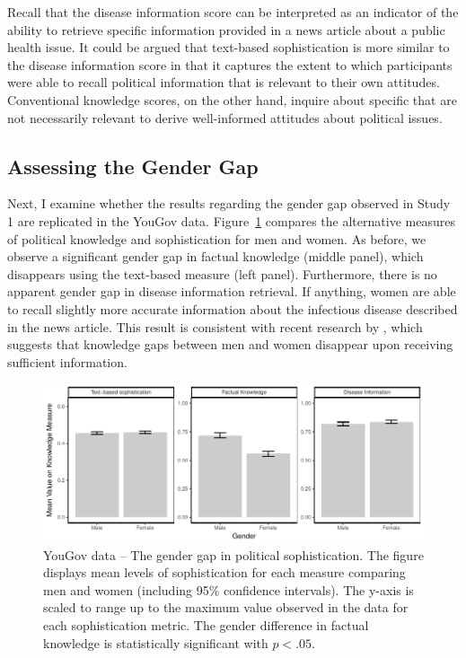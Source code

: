 \documentclass[12pt]{article}
\begin{document}
Recall that the disease information score can be interpreted as an indicator of the ability to retrieve specific information provided in a news article about a public health issue. It could be argued that text-based sophistication is more similar to the disease information score in that it captures the extent to which participants were able to recall political information that is relevant to their own attitudes. Conventional knowledge scores, on the other hand, inquire about specific that are not necessarily relevant to derive well-informed attitudes about political issues.


\subsection*{Assessing the Gender Gap}

Next, I examine whether the results regarding the gender gap observed in Study 1 are replicated in the YouGov data. Figure~\ref{fig:yg_meandiff} compares the alternative measures of political knowledge and sophistication for men and women. As before, we observe a significant gender gap in factual knowledge (middle panel), which disappears using the text-based measure (left panel). Furthermore, there is no apparent gender gap in disease information retrieval. If anything, women are able to recall slightly more accurate information about the infectious disease described in the news article. This result is consistent with recent research by \citet{jerit2017revisiting}, which suggests that knowledge gaps between men and women disappear upon receiving sufficient information.

\begin{figure}[h]\centering
\includegraphics{../fig/yg_meandiff.pdf}
\caption{YouGov data -- The gender gap in political sophistication. The figure displays mean levels of sophistication for each measure comparing men and women (including 95\% confidence intervals). The y-axis is scaled to range up to the maximum value observed in the data for each sophistication metric. The gender difference in factual knowledge is statistically significant with $p<.05$.}\label{fig:yg_meandiff}
\end{figure}
\end{document}

